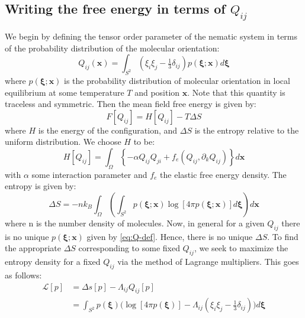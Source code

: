 \documentclass[reqno]{article}
\begin{document}
	\subsection{Writing the free energy in terms of $Q_{ij}$}
	We begin by defining the tensor order parameter of the nematic system in terms of the probability distribution of the molecular orientation:
	\begin{equation} \label{eq:Q-def}
		Q_{ij} (\mathbf{x}) 
		= \int_{S^2} \left( \xi_i \xi_j - \tfrac13 \delta_{ij} \right)
		p(\mathbf{\xi} ; \mathbf{x}) d \mathbf{\xi}
	\end{equation}
	where $p(\mathbf{\xi} ; \mathbf{x})$ is the probability distribution of molecular orientation in local equilibrium at some temperature $T$ and position $\mathbf{x}$. 
	Note that this quantity is traceless and symmetric.
	Then the mean field free energy is given by:
	\begin{equation}
		F \left[ Q_{ij} \right] = H \left[ Q_{ij} \right] - T \Delta S
	\end{equation}
	where $H$ is the energy of the configuration, and $\Delta S$ is the entropy relative to the uniform distribution.
	We choose $H$ to be:
	\begin{equation}
		H\left[ Q_{ij} \right]
		= \int_{\Omega} \left\{ -\alpha Q_{ij} Q_{ji} + f_e 	\left( Q_{ij}, \partial_k Q_{ij} \right) \right\} d \mathbf{x}
	\end{equation}
	with $\alpha$ some interaction parameter and $f_e$ the elastic free energy density.
	The entropy is given by:
	\begin{equation} \label{eq:entropy-def}
		\Delta S 
		= -n k_B \int_{\Omega} \left(
		\int_{S^2} p(\mathbf{\xi} ; \mathbf{x}) 
		\log \left[ 4 \pi p( \mathbf{\xi} ; \mathbf{x} ) \right] d \mathbf{\xi} \right) d \mathbf{x}
	\end{equation}
	where n is the number density of molecules.
	Now, in general for a given $Q_{ij}$ there is no unique $p(\mathbf{\xi} ; \mathbf{x})$ given by \eqref{eq:Q-def}. 
	Hence, there is no unique $\Delta S$.
	To find the appropriate $\Delta S$ corresponding to some fixed $Q_{ij}$, we seek to maximize the entropy density for a fixed $Q_{ij}$ via the method of Lagrange multipliers. 
	This goes as follows:
	\begin{equation}
	\begin{split}
		\mathcal{L} [p]
		&= \Delta s [p] - \Lambda_{ij} Q_{ij} [p] \\
		&= \int_{S^2} p( \mathbf{\xi}) 
		\biggl(
		\log \left[ 4\pi p(\mathbf{\xi}) \right]
		- \Lambda_{ij} \left( \xi_i \xi_j - \tfrac13 \delta_{ij} \right)
		\biggr) d\mathbf{\xi}
	\end{split}
	\end{equation}
\end{document}
